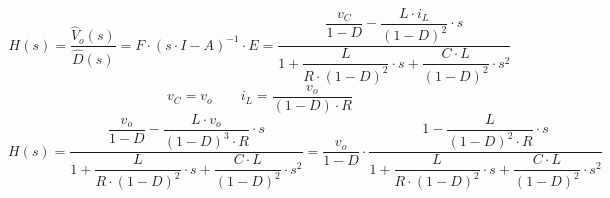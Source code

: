 \documentclass[a4paper,11pt,fleqn]{article}
\begin{document}
\[ H(s) = \dfrac{\hat{V}_o(s)}{\hat{D}(s)} = F \cdot (s \cdot I - A)^{-1} \cdot E
    = \dfrac{\dfrac{v_C}{1 - D} - \dfrac{L \cdot i_L}{(1 - D)^2} \cdot s}
        {1 + \dfrac{L}{R \cdot (1 - D)^2} \cdot s + \dfrac{C \cdot L}{(1 - D)^2} \cdot s^2}
\]
\[ v_C = v_o \qquad i_L = \dfrac{v_o}{(1 - D) \cdot R} \]
\[ H(s) = \dfrac{\dfrac{v_o}{1 - D} - \dfrac{L \cdot v_o}{(1 - D)^3 \cdot R} \cdot s}
        {1 + \dfrac{L}{R \cdot (1 - D)^2} \cdot s + \dfrac{C \cdot L}{(1 - D)^2} \cdot s^2}
    = \dfrac{v_o}{1 - D} \cdot \dfrac{1 - \dfrac{L}{(1 - D)^2 \cdot R} \cdot s}
        {1 + \dfrac{L}{R \cdot (1 - D)^2} \cdot s + \dfrac{C \cdot L}{(1 - D)^2} \cdot s^2}
\]
\end{document}
